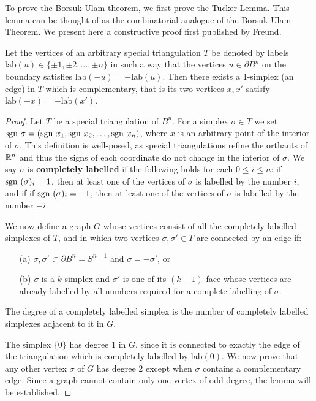 To prove the Borsuk-Ulam theorem, we first prove the Tucker Lemma. This lemma can be thought of as the combinatorial analogue of the Borsuk-Ulam Theorem.
We present here a constructive proof first published by Freund.\cite{freund1981constructive}
\begin{lemma}
    Let the vertices of an arbitrary special triangulation $T$ be denoted by labels $\text{lab} (u) \in \{\pm1, \pm2,\dots ,\pm n\}$
    in such a way that the vertices $u \in \partial B^n$ on the boundary satisfies $\text{lab} (-u) = -\text{lab} (u)$. Then there exists a 1-simplex (an edge) in $T$ which is complementary, that is its two vertices $x,x'$ satisfy $\text{lab} (-x) = -\text{lab} (x')$.
\end{lemma} 
\begin{proof}
    Let $T$ be a special triangulation of $B^n$. For a simplex $\sigma \in T$ we set $\text{sgn } \sigma = (\text{sgn } x_1, \text{sgn } x_2, \dots, \text{sgn } x_n)$, where $x$ is an arbitrary point 
    of the interior of $\sigma$. This definition is well-posed, as special triangulations refine the orthants of $\mathbb R^n$ and thus the signs of each coordinate do not change in the interior of $\sigma$. 
    We say $\sigma$ is \textbf{completely labelled} if the following holds for each $0\leq i\leq n$: if $\text{sgn }(\sigma)_i =1$, then at least one of the vertices of $\sigma$ is labelled by the number $i$, and if 
    if $\text{sgn }(\sigma)_i =-1$, then at least one of the vertices of $\sigma$ is labelled by the number $-i$.

    We now define a graph $G$ whose vertices consist of all the completely labelled simplexes of $T$, and in which two vertices $\sigma, \sigma' \in T$ are connected by an edge if:
    \begin{enumerate}
        \item[(a)] $\sigma, \sigma' \subset \partial B^n = S^{n-1}$ and $\sigma = -\sigma'$, or
        \item[(b)] $\sigma$ is a $k$-simplex and $\sigma'$ is one of its $(k-1)$-face whose vertices are already labelled by all numbers required for a complete labelling of $\sigma$.
    \end{enumerate}

    The degree of a completely labelled simplex is the number of completely labelled simplexes adjacent to it in $G$.

    The simplex $\{0\}$ has degree $1$ in $G$, since it is connected to exactly the edge of the triangulation which is completely labelled by $\text{lab}(0)$. 
    We now prove that any other vertex $\sigma$ of $G$ has degree 2 except when $\sigma$ contains a complementary edge. 
    Since a graph cannot contain only one vertex of odd degree, the lemma will be established. 


\end{proof}
